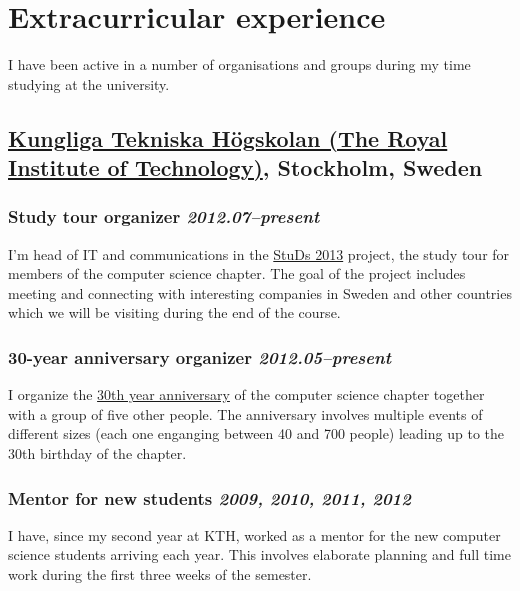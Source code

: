 \documentclass[a4paper,11pt]{article}
\newcommand{\icon}[1]{\textcolor{lightgray}{#1}}
\newcommand{\iconl}[1]{\hspace{-0.5cm}\makebox[0.3cm][c]{\icon{#1}}\hspace{0.2cm}}
\newcommand{\worktitle}[1]{\textbf{#1}}
\newcommand{\duration}[1]{\textsl{#1}}
\newcommand{\theplace}[2][]{\subsection*{\textbf{#2}#1}}
\newcommand{\thework}[2]{\subsubsection*{%
  \iconl{$\blacksquare$}%
  \worktitle{#1}%
  \hfill\duration{#2}}\par%
}
\begin{document}
\section*{Extracurricular  experience}%
I have been active in a number of organisations and groups during my time studying at the university.

\theplace[, Stockholm, Sweden]{\href{http://kth.se}{Kungliga Tekniska Högskolan (The Royal Institute of Technology)}}

\thework{Study tour organizer}{2012.07--present}
I'm head of IT and communications in the \href{http://studieresan.se}{StuDs 2013} project, the study tour for members of the computer science chapter. The goal of the project includes meeting and connecting with interesting companies in Sweden and other countries which we will be visiting during the end of the course.

\thework{30-year anniversary organizer}{2012.05--present}
I organize the \href{http://djubileet.se/}{30th year anniversary} of the computer science chapter together with a group of five other people. The anniversary involves multiple events of different sizes (each one enganging between 40 and 700 people) leading up to the 30th birthday of the chapter.

\thework{Mentor for new students}{2009, 2010, 2011, 2012}
I have, since my second year at KTH, worked as a mentor for the new computer science students arriving each year. This involves elaborate planning and full time work during the first three weeks of the semester.
\end{document}
